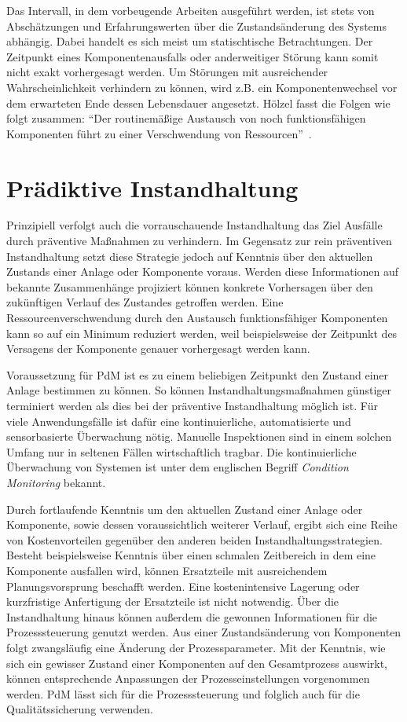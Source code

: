 Das Intervall, in dem vorbeugende Arbeiten ausgeführt werden, ist stets von Abschätzungen und Erfahrungswerten über die Zustandsänderung des Systems abhängig. Dabei handelt es sich meist um statischtische Betrachtungen. Der Zeitpunkt eines Komponentenausfalls oder anderweitiger Störung kann somit nicht exakt vorhergesagt werden. Um Störungen mit ausreichender Wahrscheinlichkeit verhindern zu können, wird z.B. ein Komponentenwechsel vor dem erwarteten Ende dessen Lebensdauer angesetzt. Hölzel fasst die Folgen wie folgt zusammen: \enquote{Der routinemäßige Austausch von noch funktionsfähigen Komponenten führt zu einer Verschwendung von Ressourcen}~\cite[S.~29]{Holzel.2019}.
\section{Prädiktive Instandhaltung}
\label{sec:prädiktive_instandhaltung}
Prinzipiell verfolgt auch die vorrauschauende Instandhaltung das Ziel Ausfälle durch präventive Maßnahmen zu verhindern. Im Gegensatz zur rein präventiven Instandhaltung setzt diese Strategie jedoch auf Kenntnis über den aktuellen Zustands einer Anlage oder Komponente voraus. Werden diese Informationen auf bekannte Zusammenhänge projiziert können konkrete Vorhersagen über den zukünftigen Verlauf des Zustandes getroffen werden. Eine Ressourcenverschwendung durch den Austausch funktionsfähiger Komponenten kann so auf ein Minimum reduziert werden, weil beispielsweise der Zeitpunkt des Versagens der Komponente genauer vorhergesagt werden kann.

Voraussetzung für PdM ist es zu einem beliebigen Zeitpunkt den Zustand einer Anlage bestimmen zu können. So können Instandhaltungsmaßnahmen günstiger terminiert werden als dies bei der präventive Instandhaltung möglich ist. Für viele Anwendungsfälle ist dafür eine kontinuierliche, automatisierte und sensorbasierte Überwachung nötig. Manuelle Inspektionen sind in einem solchen Umfang nur in seltenen Fällen wirtschaftlich tragbar. Die kontinuierliche Überwachung von Systemen ist unter dem englischen Begriff \textit{Condition Monitoring} bekannt.

Durch fortlaufende Kenntnis um den aktuellen Zustand einer Anlage oder Komponente, sowie dessen voraussichtlich weiterer Verlauf, ergibt sich eine Reihe von Kostenvorteilen gegenüber den anderen beiden Instandhaltungsstrategien. Besteht beispielsweise Kenntnis über einen schmalen Zeitbereich in dem eine Komponente ausfallen wird, können Ersatzteile mit ausreichendem Planungsvorsprung beschafft werden. Eine kostenintensive Lagerung oder kurzfristige Anfertigung der Ersatzteile ist nicht notwendig. Über die Instandhaltung hinaus können außerdem die gewonnen Informationen für die Prozesssteuerung genutzt werden. Aus einer Zustandsänderung von Komponenten folgt zwangsläufig eine Änderung der Prozessparameter. Mit der Kenntnis, wie sich ein gewisser Zustand einer Komponenten auf den Gesamtprozess auswirkt, können entsprechende Anpassungen der Prozesseinstellungen vorgenommen werden. PdM lässt sich für die Prozesssteuerung und folglich auch für die Qualitätssicherung verwenden.

